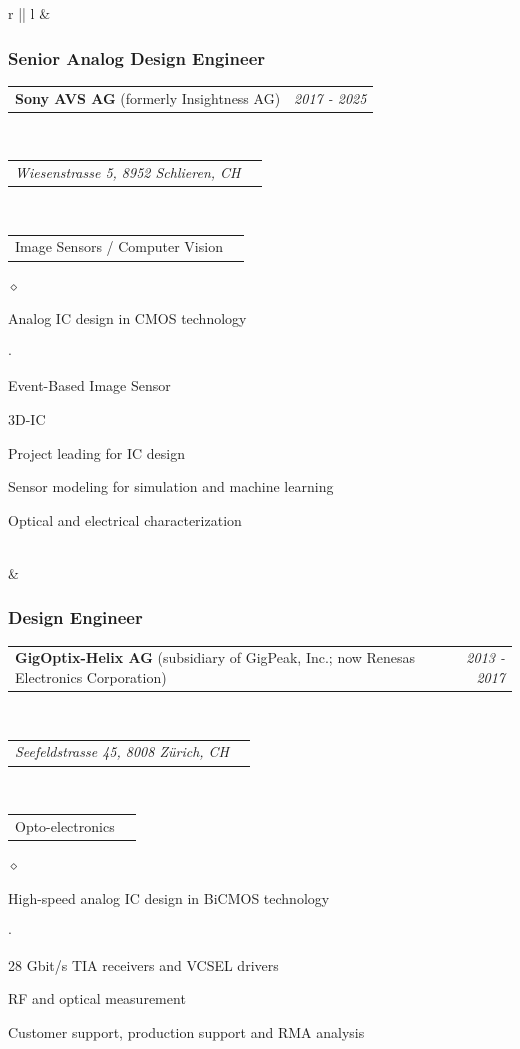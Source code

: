 \documentclass[a4paper]{article}
\makeatletter
\newlength{\sectsep}
\newlength{\subsectsep}
\newcommand{\headerrow}[2]
{\begin{tabular*}{\textwidth}{l@{\extracolsep{\fill}}r}
    #1 &
    #2 \\
\end{tabular*}}
\renewenvironment{itemize}{
  \begin{list}{$\diamond$}{
    \setlength{\topsep}{0.1em}
    \setlength{\itemsep}{0em}
    \setlength{\parskip}{0pt}
    \setlength{\parsep}{0em}
  }
}{
  \end{list}
}
\newenvironment{itemize2}{
  \begin{list}{$\cdot$}{
    \setlength{\topsep}{0.1em}
    \setlength{\itemsep}{0em}
    \setlength{\parskip}{0pt}
    \setlength{\parsep}{0em}
  }
}{
  \end{list}
}
\makeatother
\begin{document}
\begin{longtable}{r || l}
  & \begin{minipage}{0.9\textwidth}
      \vspace{\subsectsep}
      \subsubsection*{Senior Analog Design Engineer}
      \headerrow
        {\textbf{Sony AVS AG} (formerly Insightness AG)}{\emph{2017 - 2025}}
      \\
      \headerrow
        {\emph{Wiesenstrasse 5, 8952 Schlieren, CH}}{}
      \\
      \headerrow
      {Image Sensors / Computer Vision}{}
      
      \begin{itemize}
        \item Analog IC design in CMOS technology
        \begin{itemize2}
            \item Event-Based Image Sensor
            \item 3D-IC
        \end{itemize2}
        \item Project leading for IC design
        \item Sensor modeling for simulation and machine learning
        \item Optical and electrical characterization
      \end{itemize}
  \end{minipage} \\[\sectsep]

  & \begin{minipage}{0.9\textwidth}
      \vspace{\subsectsep}
      \subsubsection*{Design Engineer}
      \headerrow
        {\textbf{GigOptix-Helix AG} (subsidiary of GigPeak, Inc.; now Renesas Electronics Corporation)}{\emph{2013 - 2017}}
      \\
      \headerrow
        {\emph{Seefeldstrasse 45, 8008 Zürich, CH}}{}
      \\
      \headerrow
        {Opto-electronics}{}

      \begin{itemize}
          \item High-speed analog IC design in BiCMOS technology
          \begin{itemize2}
              \item 28 Gbit/s TIA receivers and VCSEL drivers
          \end{itemize2}
          \item RF and optical measurement
          \item Customer support, production support and RMA analysis
      \end{itemize}
  \end{minipage} \\[\sectsep]


\end{longtable}
\end{document}
